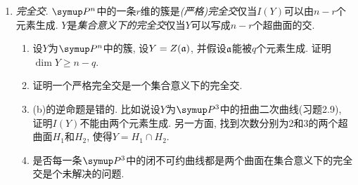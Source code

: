 \begin{enumerate}
\begin{enumerate}
        \end{enumerate}
    \item \emph{完全交}. $\PP{n}$中的一条$r$维的簇是\emph{(严格)完全交}仅当$I(Y)$可以由$n-r$个元素生成. $Y$是\emph{集合意义下的完全交}仅当$Y$可以写成$n-r$个超曲面的交.
        \begin{enumerate}
            \item 设$Y$为$\PP{n}$中的簇, 设$Y=Z(\mathfrak{a})$, 并假设$\mathfrak{a}$能被$q$个元素生成. 证明$\dim Y\geq n-q$.
            \item 证明一个严格完全交是一个集合意义下的完全交.
            \item (b)的逆命题是错的. 比如说设$Y$为$\PP{3}$中的扭曲二次曲线(习题2.9), 证明$I(Y)$不能由两个元素生成. 另一方面, 找到次数分别为2和3的两个超曲面$H_1$和$H_2$, 使得$Y = H_1\cap H_2$.
            \item 是否每一条$\PP{3}$中的闭不可约曲线都是两个曲面在集合意义下的完全交是个未解决的问题.
        \end{enumerate}
\end{enumerate}
